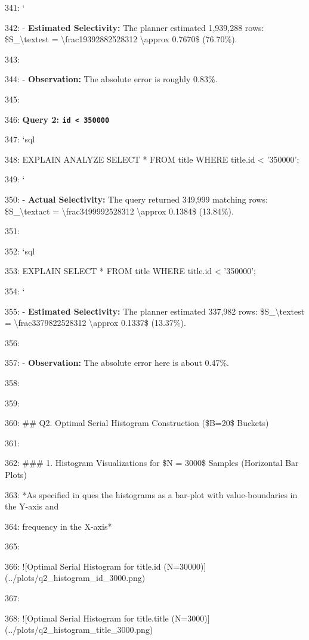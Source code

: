 \documentclass[11pt,a4paper]{article}
\begin{document}
{341: \texttt{}`

342: - \textbf{Estimated Selectivity:} The planner estimated 1,939,288 rows: \$S\_{\textbackslash{}text{est}} = \textbackslash{}frac{1939288}{2528312} \textbackslash{}approx 0.7670\$ (76.70\%).

343:

344: - \textbf{Observation:} The absolute error is roughly 0.83\%.

345:

346: \textbf{Query 2: \texttt{id < 350000}}

347: \texttt{}`sql

348: EXPLAIN ANALYZE SELECT * FROM title WHERE title.id < '350000';

349: \texttt{}`

350: - \textbf{Actual Selectivity:} The query returned 349,999 matching rows: \$S\_{\textbackslash{}text{act}} = \textbackslash{}frac{349999}{2528312} \textbackslash{}approx 0.1384\$ (13.84\%).

351:

352: \texttt{}`sql

353: EXPLAIN SELECT * FROM title WHERE title.id < '350000';

354: \texttt{}`

355: - \textbf{Estimated Selectivity:} The planner estimated 337,982 rows: \$S\_{\textbackslash{}text{est}} = \textbackslash{}frac{337982}{2528312} \textbackslash{}approx 0.1337\$ (13.37\%).

356:

357: - \textbf{Observation:} The absolute error here is about 0.47\%.

358:

359:

360: \#\# Q2. Optimal Serial Histogram Construction (\$B=20\$ Buckets)

361:

362: \#\#\# 1. Histogram Visualizations for \$N = 3000\$ Samples (Horizontal Bar Plots)

363: *As specified in ques the histograms as a bar-plot with value-boundaries in the Y-axis and

364: frequency in the X-axis*

365:

366: ![Optimal Serial Histogram for title.id (N=30000)](../plots/q2\_histogram\_id\_3000.png)

367:

368: ![Optimal Serial Histogram for title.title (N=3000)](../plots/q2\_histogram\_title\_3000.png)

}
\end{document}
